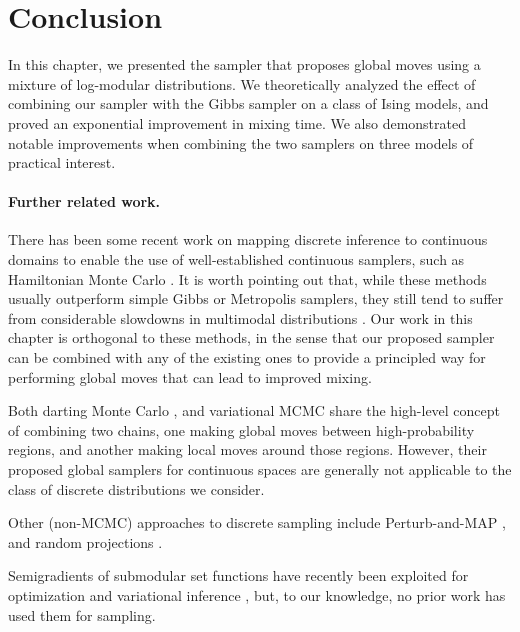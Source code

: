 \section{Conclusion}
In this chapter, we presented the \Ms{} sampler that proposes global moves using a mixture of log-modular distributions.
We theoretically analyzed the effect of combining our sampler with the Gibbs sampler on a class of Ising models, and proved an exponential improvement in mixing time.
We also demonstrated notable improvements when combining the two samplers on three models of practical interest.

\paragraph{Further related work.}
There has been some recent work on mapping discrete inference to continuous domains \citep{zhang12, pakman13, dinh17, nishimura18} to enable the use of well-established continuous samplers, such as Hamiltonian Monte Carlo \citep{neal12, betancourt17}.
It is worth pointing out that, while these methods usually outperform simple Gibbs or Metropolis samplers, they still tend to suffer from considerable slowdowns in multimodal distributions \citep{neal12}.
Our work in this chapter is orthogonal to these methods, in the sense that our proposed sampler can be combined with any of the existing ones to provide a principled way for performing global moves that can lead to improved mixing.

Both darting Monte Carlo \citep{sminchisescu07,ahn13}, and variational MCMC \citep{defreitas01} share the high-level concept of combining two chains, one making global moves between high-probability regions, and another making local moves around those regions.
However, their proposed global samplers for continuous spaces are generally not applicable to the class of discrete distributions we consider.

Other (non-MCMC) approaches to discrete sampling include Perturb-and-MAP \citep{papandreou11,hazan13}, and random projections \citep{zhu15}.

Semigradients of submodular set functions have recently been exploited for optimization \citep{iyer13, jegelka11} and variational inference \citep{djolonga16}, but, to our knowledge, no prior work  has used them for sampling.